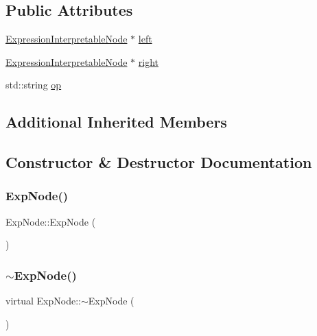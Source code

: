 \subsection*{Public Attributes}
\begin{DoxyCompactItemize}
\item 
\hyperlink{classExpressionInterpretableNode}{Expression\+Interpretable\+Node} $\ast$ \hyperlink{classExpNode_abd5f79666f0b8f05e7a3fca1bfc12ebe}{left}
\item 
\hyperlink{classExpressionInterpretableNode}{Expression\+Interpretable\+Node} $\ast$ \hyperlink{classExpNode_af298caffdc70c8f20095af1191e801cd}{right}
\item 
std\+::string \hyperlink{classExpNode_a7ad8830c081f08f598e4697539b22c28}{op}
\end{DoxyCompactItemize}
\subsection*{Additional Inherited Members}


\subsection{Constructor \& Destructor Documentation}
\mbox{\label{classExpNode_a72dae84bdb441ca58d862a36912a5f67}} 
\subsubsection{\texorpdfstring{Exp\+Node()}{ExpNode()}}
{\footnotesize\ttfamily Exp\+Node\+::\+Exp\+Node (\begin{DoxyParamCaption}{ }\end{DoxyParamCaption})}

\mbox{\label{classExpNode_a217540657865f605cb6847280e00bb21}} 
\subsubsection{\texorpdfstring{$\sim$\+Exp\+Node()}{~ExpNode()}}
{\footnotesize\ttfamily virtual Exp\+Node\+::$\sim$\+Exp\+Node (\begin{DoxyParamCaption}{ }\end{DoxyParamCaption})\hspace{0.3cm}{\ttfamily [virtual]}}



